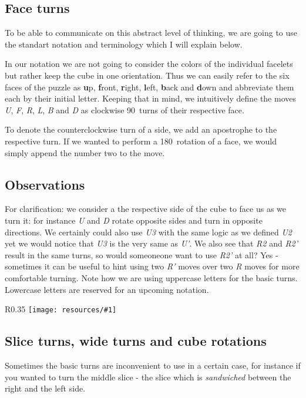 \documentclass{scrreprt}
\newcommand{\wrapfig}[5] {
	\begin{wrapfigure}{#2}{#3\textwidth}
	\centering
	\texttt{[image: resources/\#1]}
	\caption*{#5}
	\end{wrapfigure}
}
\begin{document}
\subsection{Face turns}
To be able to communicate on this abstract level of thinking, we are going to use the standart notation and terminology which I will explain below.\par
In our notation we are not going to consider the colors of the individual facelets but rather keep the cube in one orientation. Thus we can easily refer to the six faces of the puzzle as \textbf{u}p, \textbf{f}ront, \textbf{r}ight, \textbf{l}eft, \textbf{b}ack and \textbf{d}own and abbreviate them each by their initial letter. Keeping that in mind, we intuitively define the moves \emph{U}, \emph{F}, \emph{R}, \emph{L}, \emph{B} and \emph{D} as clockwise 90\textdegree\ turns of their respective face.\par
To denote the counterclockwise turn of a side, we add an apostrophe to the respective turn. If we wanted to perform a 180\textdegree\ rotation of a face, we would simply append the number two to the move.


\subsection{Observations}
For clarification: we consider a the respective side of the cube to face us as we turn it: for instance \emph{U} and \emph{D} rotate opposite sides and turn in opposite directions. We certainly could also use \emph{U3} with the same logic as we defined \emph{U2} yet we would notice that \emph{U3} is the very same as \emph{U'}. We also see that \emph{R2} and \emph{R2'} result in the same turns, so would someoneone want to use \emph{R2'} at all? Yes - sometimes it can be useful to hint using two \emph{R'} moves over two \emph{R} moves for more comfortable turning. Note how we are using uppercase letters for the basic turns. Lowercase letters are reserved for an upcoming notation.

\wrapfig{slices.png}{R}{0.35}{0.3}{From top to bottom: the middle, equatorial and standing slice}

\subsection{Slice turns, wide turns and cube rotations}
Sometimes the basic turns are inconvenient to use in a certain case, for instance if you wanted to turn the middle slice - the slice which is \emph{sandwiched} between the right and the left side.\par
\end{document}
